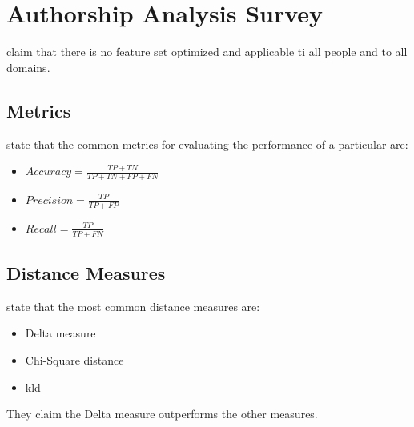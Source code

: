 \section{Authorship Analysis Survey}
\label{sec:authorship_analysis_survey}

\citet{elmanarelbouanani_authorship_2014} claim that there is no feature set optimized and applicable ti all people and to all domains.

\subsection{Metrics}
\citet{elmanarelbouanani_authorship_2014} state that the common metrics for evaluating the performance of a particular are:
\begin{itemize}
    \item $Accuracy = \frac{TP + TN}{TP + TN + FP + FN}$
    \item $Precision = \frac{TP}{TP + FP}$
    \item $Recall = \frac{TP}{TP + FN}$
\end{itemize}

\subsection{Distance Measures}
\citet{elmanarelbouanani_authorship_2014} state that the most common distance measures are:
\begin{itemize}
    \item Delta measure
    \item Chi-Square distance
    \item \ac{kld}
\end{itemize}
They claim the Delta measure outperforms the other measures.